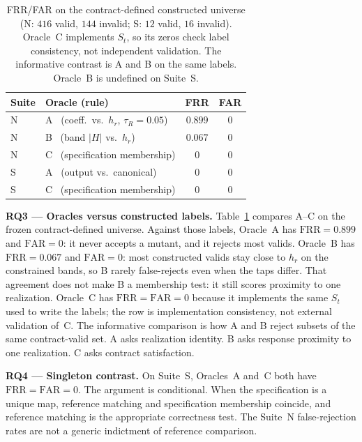 \documentclass{article}
\begin{document}
\begin{table}[t]
\caption{FRR/FAR on the contract-defined constructed universe
(N: $416$ valid, $144$ invalid; S: $12$ valid, $16$ invalid).
Oracle~C implements $S_t$, so its zeros check label consistency,
not independent validation.
The informative contrast is A and B on the same labels.
Oracle~B is undefined on Suite~S.}
\label{tab:oracle}
\centering
\footnotesize
\setlength{\tabcolsep}{3.2pt}
\begin{tabular}{@{}llcc@{}}
\hline
Suite & Oracle (rule) & FRR & FAR \\
\hline
N & A \ (coeff.\ vs.\ $h_r$, $\tau_R=0.05$) & $0.899$ & $0$ \\
N & B \ (band $\lvert H\rvert$ vs.\ $h_r$) & $0.067$ & $0$ \\
N & C \ (specification membership) & $0$ & $0$ \\
S & A \ (output vs.\ canonical) & $0$ & $0$ \\
S & C \ (specification membership) & $0$ & $0$ \\
\hline
\end{tabular}
\end{table}

\noindent\textbf{RQ3 --- Oracles versus constructed labels.}
Table~\ref{tab:oracle} compares A--C on the frozen contract-defined
universe.
Against those labels, Oracle~A has $\mathrm{FRR}=0.899$ and
$\mathrm{FAR}=0$: it never accepts a mutant, and it rejects most
valids.
Oracle~B has $\mathrm{FRR}=0.067$ and $\mathrm{FAR}=0$: most
constructed valids stay close to $h_r$ on the constrained bands,
so B rarely false-rejects even when the taps differ.
That agreement does not make B a membership test: it still scores
proximity to one realization.
Oracle~C has $\mathrm{FRR}=\mathrm{FAR}=0$ because it implements
the same $S_t$ used to write the labels; the row is
implementation consistency, not external validation of~C.
The informative comparison is how A and B reject subsets of the
same contract-valid set.
A asks realization identity.
B asks response proximity to one realization.
C asks contract satisfaction.

\noindent\textbf{RQ4 --- Singleton contrast.}
On Suite~S, Oracles~A and~C both have $\mathrm{FRR}=\mathrm{FAR}=0$.
The argument is conditional.
When the specification is a unique map, reference matching and
specification membership coincide, and reference matching is the
appropriate correctness test.
The Suite~N false-rejection rates are not a generic indictment of
reference comparison.
\end{document}
